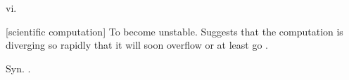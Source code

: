  vi.

\begin{inparaenum}
\item {[}scientific computation] To become unstable. Suggests that the
    computation is diverging so rapidly that it will soon overflow or at least
    go .
\item Syn. .
\end{inparaenum}

